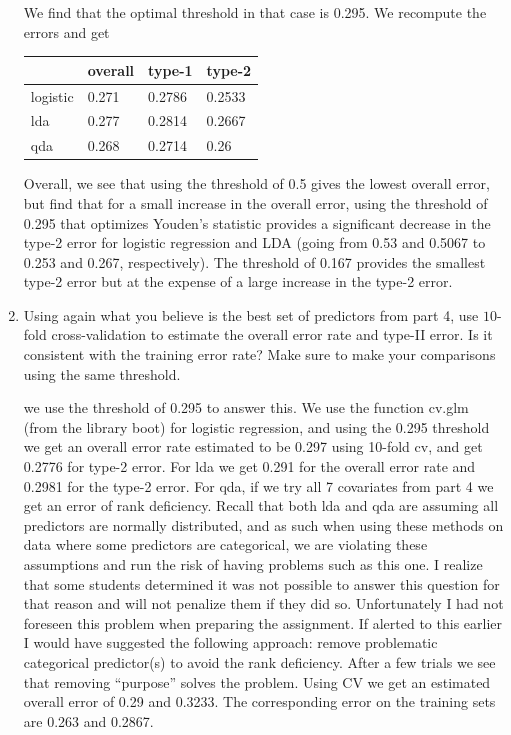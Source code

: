 \documentclass[11pt]{article}
\begin{document}
\begin{enumerate}
   We find that the optimal threshold in that case is 0.295. We recompute the errors and get

     \begin{tabular}{| l | lll |}
  \hline
   & overall & type-1 & type-2 \\
   \hline
    logistic &   0.271 & 0.2786 & 0.2533\\
    lda&  0.277 &  0.2814 &  0.2667\\
    qda &  0.268 &  0.2714 & 0.26\\
    \hline
  \end{tabular}
  
  Overall, we see that using the threshold of 0.5 gives the lowest overall error, but find that for a small increase in the overall error, using the threshold of 0.295 that optimizes Youden's statistic provides a significant decrease in the type-2 error for logistic regression and LDA (going from  0.53 and 0.5067 to 0.253 and 0.267, respectively). The threshold of 0.167 provides the smallest type-2 error but at the expense of a large increase in the type-2 error.
  
  \item Using again what you believe is the best set of predictors from part 4, use $10$-fold cross-validation to estimate the overall error rate and  type-II error. Is it consistent with the training error rate?   Make sure to make your comparisons using the same threshold.

     we use the threshold of 0.295 to answer this.  We use the function cv.glm (from the library boot) for logistic regression, and using the 0.295 threshold we get an overall error rate estimated to be 0.297 using 10-fold cv, and get 0.2776 for type-2 error. For lda we get 0.291 for the overall error rate and 0.2981 for the type-2 error. For qda, if we try all 7 covariates from part 4  we get an error of rank deficiency. Recall that both lda and qda are assuming all predictors are normally distributed, and as such when using these methods on data where some predictors are categorical, we are violating these assumptions and run the risk of having problems such as this one. I realize that some students determined it was not possible to answer this question for that reason and will not penalize them if they did so. Unfortunately I had not foreseen this problem when  preparing the assignment. If alerted to this earlier I would have suggested the following approach: remove problematic categorical predictor(s) to avoid the rank deficiency. After a few trials we see that removing ``purpose'' solves the problem. Using CV we get an estimated overall error of 0.29 and 0.3233. The corresponding error on the training sets are 0.263 and 0.2867.
    

\end{enumerate}
\end{document}
